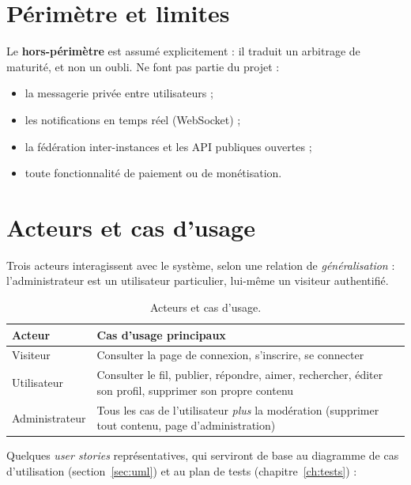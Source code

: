 \section{Périmètre et limites}
\label{sec:limites}

Le \textbf{hors-périmètre} est assumé explicitement : il traduit un arbitrage de maturité, et
non un oubli. Ne font pas partie du projet :

\begin{itemize}
  \item la messagerie privée entre utilisateurs ;
  \item les notifications en temps réel (WebSocket) ;
  \item la fédération inter-instances et les API publiques ouvertes ;
  \item toute fonctionnalité de paiement ou de monétisation.
\end{itemize}

\section{Acteurs et cas d'usage}
\label{sec:acteurs}

Trois acteurs interagissent avec le système, selon une relation de \emph{généralisation} :
l'administrateur est un utilisateur particulier, lui-même un visiteur authentifié.

\begin{table}[ht]
\centering
\renewcommand{\arraystretch}{1.3}
\small
\begin{tabularx}{\textwidth}{@{}L{3cm} X@{}}
\toprule
\textbf{Acteur} & \textbf{Cas d'usage principaux} \\
\midrule
Visiteur & Consulter la page de connexion, s'inscrire, se connecter \\
Utilisateur & Consulter le fil, publier, répondre, aimer, rechercher, éditer son profil, supprimer son propre contenu \\
Administrateur & Tous les cas de l'utilisateur \emph{plus} la modération (supprimer tout contenu, page d'administration) \\
\bottomrule
\end{tabularx}
\caption{Acteurs et cas d'usage.}
\label{tab:acteurs}
\end{table}

Quelques \emph{user stories} représentatives, qui serviront de base au diagramme de cas
d'utilisation (section~\ref{sec:uml}) et au plan de tests (chapitre~\ref{ch:tests}) :

